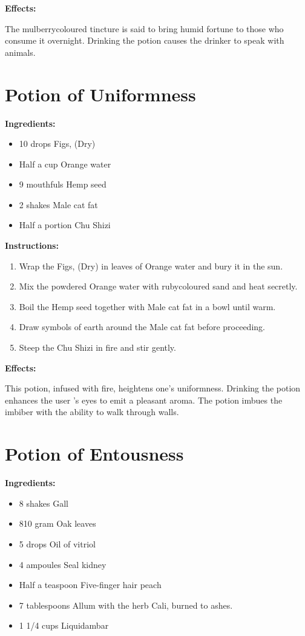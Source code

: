 \documentclass{article}
\begin{document}
\textbf{Effects:}

The mulberrycoloured tincture is said to bring humid fortune to those who consume it overnight. Drinking the potion causes the drinker to speak with animals.

\newpage
\section*{Potion of Uniformness}

\textbf{Ingredients:}

\begin{itemize}
  \item 10 drops Figs, (Dry)
  \item Half a cup Orange water
  \item 9 mouthfuls Hemp seed
  \item 2 shakes Male cat fat
  \item Half a portion Chu Shizi
\end{itemize}

\textbf{Instructions:}

\begin{enumerate}
  \item Wrap the Figs, (Dry) in leaves of Orange water and bury it in the sun.
  \item Mix the powdered Orange water with rubycoloured sand and heat secretly.
  \item Boil the Hemp seed together with Male cat fat in a bowl until warm.
  \item Draw symbols of earth around the Male cat fat before proceeding.
  \item Steep the Chu Shizi in fire and stir gently.
\end{enumerate}

\textbf{Effects:}

This potion, infused with fire, heightens one's uniformness. Drinking the potion enhances the user 's eyes to emit a pleasant aroma. The potion imbues the imbiber with the ability to walk through walls.

\newpage
\section*{Potion of Entousness}

\textbf{Ingredients:}

\begin{itemize}
  \item 8 shakes Gall
  \item 810 gram Oak leaves
  \item 5 drops Oil of vitriol
  \item 4 ampoules Seal kidney
  \item Half a teaspoon Five-finger hair peach
  \item 7 tablespoons Allum with the herb Cali, burned to ashes.
  \item 1 1/4 cups Liquidambar
\end{itemize}
\end{document}
